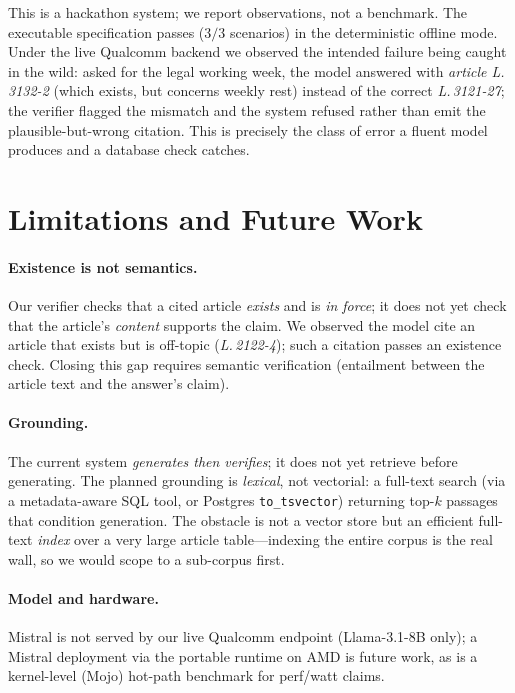 \documentclass[sigconf, nonacm]{acmart}
\begin{document}
This is a hackathon system; we report observations, not a benchmark. The
executable specification passes ($3/3$ scenarios) in the deterministic offline
mode. Under the live Qualcomm backend we observed the intended failure being
caught in the wild: asked for the legal working week, the model answered with
\emph{article L.\,3132-2} (which exists, but concerns weekly rest) instead of
the correct \emph{L.\,3121-27}; the verifier flagged the mismatch and the
system refused rather than emit the plausible-but-wrong citation. This is
precisely the class of error a fluent model produces and a database check
catches.

\section{Limitations and Future Work}
\label{sec:limits}

\paragraph{Existence is not semantics.}
Our verifier checks that a cited article \emph{exists} and is \emph{in force};
it does not yet check that the article's \emph{content} supports the claim.
We observed the model cite an article that exists but is off-topic
(\emph{L.\,2122-4}); such a citation passes an existence check. Closing this
gap requires semantic verification (entailment between the article text and the
answer's claim).

\paragraph{Grounding.}
The current system \emph{generates then verifies}; it does not yet retrieve
before generating. The planned grounding is \emph{lexical}, not vectorial: a
full-text search (via a metadata-aware SQL tool, or Postgres
\texttt{to\_tsvector}) returning top-$k$ passages that condition generation.
The obstacle is not a vector store but an efficient full-text \emph{index}
over a very large article table---indexing the entire corpus is the real wall,
so we would scope to a sub-corpus first.

\paragraph{Model and hardware.}
Mistral is not served by our live Qualcomm endpoint (Llama-3.1-8B only); a
Mistral deployment via the portable runtime on AMD is future work, as is a
kernel-level (Mojo) hot-path benchmark for perf/watt claims.
\end{document}
